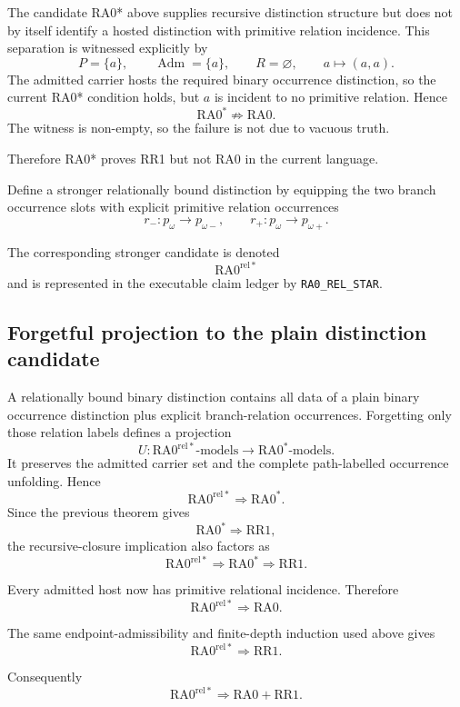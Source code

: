 \documentclass[11pt]{article}
\begin{document}
The candidate RA0* above supplies recursive distinction structure but does not
by itself identify a hosted distinction with primitive relation incidence.
This separation is witnessed explicitly by
\[
P=\{a\},
\qquad
\operatorname{Adm}=\{a\},
\qquad
R=\varnothing,
\qquad
a\mapsto(a,a).
\]
The admitted carrier hosts the required binary occurrence distinction, so the
current RA0* condition holds, but \(a\) is incident to no primitive relation.
Hence
\[
\boxed{
\mathrm{RA0}^{*}\not\Rightarrow\mathrm{RA0}.
}
\]
The witness is non-empty, so the failure is not due to vacuous truth.

Therefore RA0* proves RR1 but not RA0 in the current language.

Define a stronger relationally bound distinction by equipping the two branch
occurrence slots with explicit primitive relation occurrences
\[
r_-:p_\omega\to p_{\omega-},
\qquad
r_+:p_\omega\to p_{\omega+}.
\]

The corresponding stronger candidate is denoted
\[
\boxed{
\mathrm{RA0}^{\mathrm{rel}*}
}
\]
and is represented in the executable claim ledger by
\texttt{RA0\_REL\_STAR}.

\subsection{Forgetful projection to the plain distinction candidate}

A relationally bound binary distinction contains all data of a plain binary
occurrence distinction plus explicit branch-relation occurrences. Forgetting
only those relation labels defines a projection
\[
U:
\mathrm{RA0}^{\mathrm{rel}*}\text{-models}
\longrightarrow
\mathrm{RA0}^{*}\text{-models}.
\]
It preserves the admitted carrier set and the complete path-labelled
occurrence unfolding. Hence
\[
\boxed{
\mathrm{RA0}^{\mathrm{rel}*}
\Rightarrow
\mathrm{RA0}^{*}.
}
\]
Since the previous theorem gives
\[
\mathrm{RA0}^{*}\Rightarrow\mathrm{RR1},
\]
the recursive-closure implication also factors as
\[
\mathrm{RA0}^{\mathrm{rel}*}
\Rightarrow
\mathrm{RA0}^{*}
\Rightarrow
\mathrm{RR1}.
\]

Every admitted host now has primitive relational incidence. Therefore
\[
\boxed{
\mathrm{RA0}^{\mathrm{rel}*}
\Rightarrow
\mathrm{RA0}.
}
\]

The same endpoint-admissibility and finite-depth induction used above gives
\[
\boxed{
\mathrm{RA0}^{\mathrm{rel}*}
\Rightarrow
\mathrm{RR1}.
}
\]

Consequently
\[
\boxed{
\mathrm{RA0}^{\mathrm{rel}*}
\Rightarrow
\mathrm{RA0}+\mathrm{RR1}.
}
\]
\end{document}
